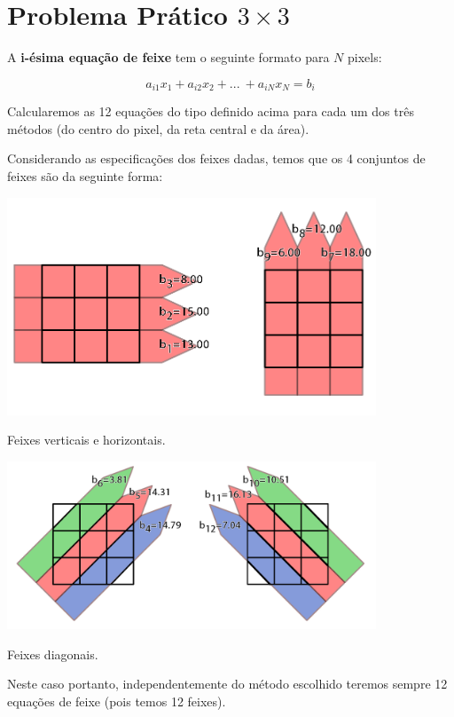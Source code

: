 \documentclass[a4paper, 12pt]{article}
\begin{document}
\section{Problema Prático $3\times 3$}

A \textbf{i-ésima equação de feixe} tem o seguinte formato para $N$ pixels:

$$a_{i1}x_1+a_{i2}x_2+...\ +a_{iN}x_N=b_i$$

Calcularemos as 12 equações do tipo definido acima para cada um dos três métodos (do centro do pixel, da reta central e da área).

Considerando as especificações dos feixes dadas, temos que os 4 conjuntos de feixes são da seguinte forma:

\begin{center}
    \includegraphics[width=11cm]{01_feixes_horizontais.fw.png}
    
    Feixes verticais e horizontais.
\end{center}

\begin{center}
    \includegraphics[width=11cm]{02_feixes_diagonais.fw.png}
    
    Feixes diagonais.
\end{center}

Neste caso portanto, independentemente do método escolhido teremos sempre 12 equações de feixe (pois temos 12 feixes).
\end{document}
